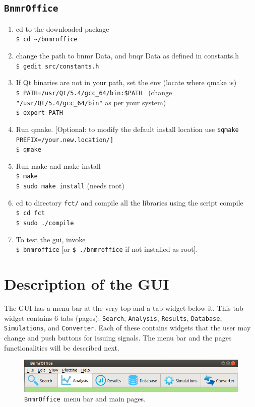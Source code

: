 \documentclass[10pt,letterpaper,oneside]{article}
\newcommand{\bof}{\texttt{BnmrOffice}}
\begin{document}
\subsection{\bof}
\begin{enumerate}
 \item  cd to the downloaded package
  \\  \verb+$ cd ~/bnmroffice+

 \item  change the path to bnmr Data, and bnqr Data as defined in constants.h
  \\  \verb+$ gedit src/constants.h+

 \item  If Qt binaries are not in your path, set the env (locate where qmake is)
\\    \verb+$ PATH=/usr/Qt/5.4/gcc_64/bin:$PATH + (change \verb+"/usr/Qt/5.4/gcc_64/bin"+ as per your system)
 \\   \verb+$ export PATH+

 \item  Run qmake. [Optional: to modify the default install location use 
 \verb+$qmake PREFIX=/your.new.location/]+ 
\\   \verb+$ qmake+

 \item  Run make and make install 
 \\ \verb+$ make+
 \\ \verb+$ sudo make install+ (needs root)

 \item cd to directory \verb+fct/+ and compile all the libraries using the script compile
\\ \verb+$ cd fct+
\\   \verb+$ sudo ./compile+

 \item  To test the gui, invoke
\\  \verb+$ bnmroffice+  [or \verb+$ ./bnmroffice+ if not installed as root].
\end{enumerate}

\newpage
\newpage
\section{Description of the GUI}
The GUI has a menu bar at the very top and a tab widget below it. 
This tab widget contains 6 tabs (pages): \verb+Search+, \verb+Analysis+, \verb+Results+, \verb+Database+, \verb+Simulations+, and \verb+Converter+. Each of these contains widgets that the user may change and push buttons for issuing signals. The menu bar and the pages functionalities will be described next.
\begin{figure}
\includegraphics[width=\textwidth]{menubar.png}
 \caption{\bof\ menu bar and main pages.}
 \label{fig-menu}
 \end{figure}
\end{document}
